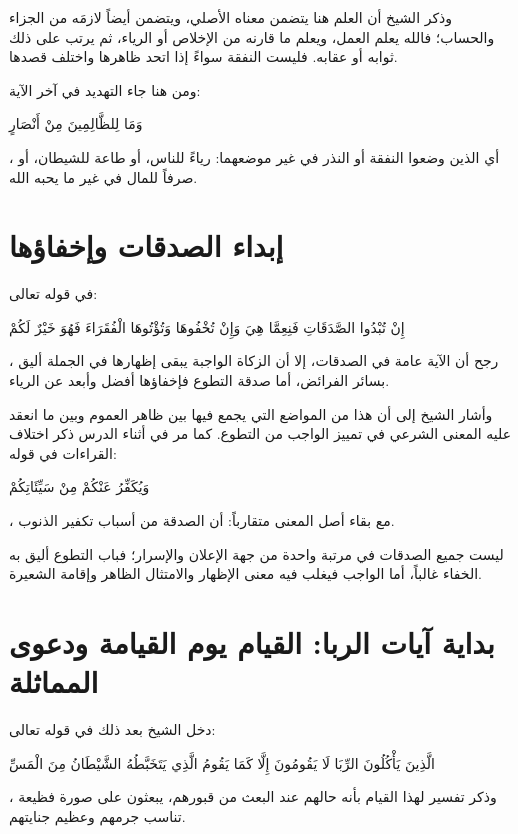 وذكر الشيخ أن العلم هنا يتضمن معناه الأصلي، ويتضمن أيضاً لازمَه من الجزاء والحساب؛ فالله يعلم العمل، ويعلم ما قارنه من الإخلاص أو الرياء، ثم يرتب على ذلك ثوابه أو عقابه. فليست النفقة سواءً إذا اتحد ظاهرها واختلف قصدها.

ومن هنا جاء التهديد في آخر الآية: \begin{ayah}وَمَا لِلظَّالِمِينَ مِنْ أَنْصَارٍ\end{ayah}، أي الذين وضعوا النفقة أو النذر في غير موضعهما: رياءً للناس، أو طاعة للشيطان، أو صرفاً للمال في غير ما يحبه الله.

\section{إبداء الصدقات وإخفاؤها}
في قوله تعالى: \begin{ayah}إِنْ تُبْدُوا الصَّدَقَاتِ فَنِعِمَّا هِيَ وَإِنْ تُخْفُوهَا وَتُؤْتُوهَا الْفُقَرَاءَ فَهُوَ خَيْرٌ لَكُمْ\end{ayah}، رجح  أن الآية عامة في الصدقات، إلا أن الزكاة الواجبة يبقى إظهارها في الجملة أليق بسائر الفرائض، أما صدقة التطوع فإخفاؤها أفضل وأبعد عن الرياء.

وأشار الشيخ إلى أن هذا من المواضع التي يجمع فيها  بين ظاهر العموم وبين ما انعقد عليه المعنى الشرعي في تمييز الواجب من التطوع. كما مر في أثناء الدرس ذكر اختلاف القراءات في قوله: \begin{ayah}وَيُكَفِّرُ عَنْكُمْ مِنْ سَيِّئَاتِكُمْ\end{ayah}، مع بقاء أصل المعنى متقارباً: أن الصدقة من أسباب تكفير الذنوب.

\begin{fawaid}
ليست جميع الصدقات في مرتبة واحدة من جهة الإعلان والإسرار؛ فباب التطوع أليق به الخفاء غالباً، أما الواجب فيغلب فيه معنى الإظهار والامتثال الظاهر وإقامة الشعيرة.
\end{fawaid}

\separator

\section{بداية آيات الربا: القيام يوم القيامة ودعوى المماثلة}
دخل الشيخ بعد ذلك في قوله تعالى: \begin{ayah}الَّذِينَ يَأْكُلُونَ الرِّبَا لَا يَقُومُونَ إِلَّا كَمَا يَقُومُ الَّذِي يَتَخَبَّطُهُ الشَّيْطَانُ مِنَ الْمَسِّ\end{ayah}، وذكر تفسير  لهذا القيام بأنه حالهم عند البعث من قبورهم، يبعثون على صورة فظيعة تناسب جرمهم وعظيم جنايتهم.

